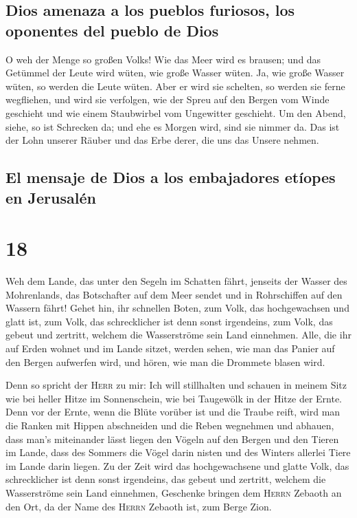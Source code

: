 \hypertarget{dios-amenaza-a-los-pueblos-furiosos-los-oponentes-del-pueblo-de-dios}{%
\subsection{Dios amenaza a los pueblos furiosos, los oponentes del
pueblo de
Dios}\label{dios-amenaza-a-los-pueblos-furiosos-los-oponentes-del-pueblo-de-dios}}

 O weh der Menge so großen Volks! Wie das Meer wird es
brausen; und das Getümmel der Leute wird wüten, wie große Wasser wüten.
 Ja, wie große Wasser wüten, so werden die Leute wüten.
Aber er wird sie schelten, so werden sie ferne wegfliehen, und wird sie
verfolgen, wie der Spreu auf den Bergen vom Winde geschieht und wie
einem Staubwirbel vom Ungewitter geschieht.  Um den
Abend, siehe, so ist Schrecken da; und ehe es Morgen wird, sind sie
nimmer da. Das ist der Lohn unserer Räuber und das Erbe derer, die uns
das Unsere nehmen.

\hypertarget{el-mensaje-de-dios-a-los-embajadores-etuxedopes-en-jerusaluxe9n}{%
\subsection{El mensaje de Dios a los embajadores etíopes en
Jerusalén}\label{el-mensaje-de-dios-a-los-embajadores-etuxedopes-en-jerusaluxe9n}}

\hypertarget{section-17}{%
\section{18}\label{section-17}}

 Weh dem Lande, das unter den Segeln im Schatten fährt,
jenseits der Wasser des Mohrenlands,  das Botschafter auf
dem Meer sendet und in Rohrschiffen auf den Wassern fährt! Gehet hin,
ihr schnellen Boten, zum Volk, das hochgewachsen und glatt ist, zum
Volk, das schrecklicher ist denn sonst irgendeins, zum Volk, das gebeut
und zertritt, welchem die Wasserströme sein Land einnehmen.
 Alle, die ihr auf Erden wohnet und im Lande sitzet,
werden sehen, wie man das Panier auf den Bergen aufwerfen wird, und
hören, wie man die Drommete blasen wird.

 Denn so spricht der \textsc{Herr} zu mir: Ich will
stillhalten und schauen in meinem Sitz wie bei heller Hitze im
Sonnenschein, wie bei Taugewölk in der Hitze der Ernte. 
Denn vor der Ernte, wenn die Blüte vorüber ist und die Traube reift,
wird man die Ranken mit Hippen abschneiden und die Reben wegnehmen und
abhauen,  dass man's miteinander lässt liegen den Vögeln
auf den Bergen und den Tieren im Lande, dass des Sommers die Vögel darin
nisten und des Winters allerlei Tiere im Lande darin liegen.
 Zu der Zeit wird das hochgewachsene und glatte Volk, das
schrecklicher ist denn sonst irgendeins, das gebeut und zertritt,
welchem die Wasserströme sein Land einnehmen, Geschenke bringen dem
\textsc{Herrn} Zebaoth an den Ort, da der Name des \textsc{Herrn}
Zebaoth ist, zum Berge Zion.

